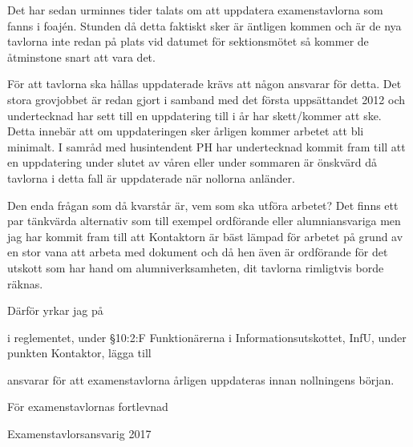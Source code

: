 \documentclass[./vt16.tex]{subfiles}
\begin{document}

Det har sedan urminnes tider talats om att uppdatera examenstavlorna som fanns i foajén. Stunden då detta faktiskt sker är äntligen kommen och är de nya tavlorna inte redan på plats vid datumet för sektionsmötet så kommer de åtminstone snart att vara det.

För att tavlorna ska hållas uppdaterade krävs att någon ansvarar för detta. Det stora grovjobbet är redan gjort i samband med det första uppsättandet 2012 och undertecknad har sett till en uppdatering till i år har skett/kommer att ske. Detta innebär att om uppdateringen sker årligen kommer arbetet att bli minimalt. I samråd med husintendent PH har undertecknad kommit fram till att en uppdatering under slutet av våren eller under sommaren är önskvärd då tavlorna i detta fall är uppdaterade när nollorna anländer.

Den enda frågan som då kvarstår är, vem som ska utföra arbetet? Det finns ett par tänkvärda alternativ som till exempel ordförande eller alumniansvariga men jag har kommit fram till att Kontaktorn är bäst lämpad för arbetet på grund av en stor vana att arbeta med dokument och då hen även är ordförande för det utskott som har hand om alumniverksamheten, dit tavlorna rimligtvis borde räknas.

Därför yrkar jag på
\begin{attsatser}
    \att i reglementet, under \S10:2:F Funktionärerna i Informationsutskottet, InfU, under punkten Kontaktor, lägga till
    \begin{itshape}
        \begin{itemizedash}
            \item ansvarar för att examenstavlorna årligen uppdateras innan nollningens början.
        \end{itemizedash}
    \end{itshape}
    
   \end{attsatser}

\begin{signatures}{1}
    För examenstavlornas fortlevnad
    \signature{Fredrik Peterson}{Examenstavlorsansvarig 2017}
\end{signatures}
\end{document}
